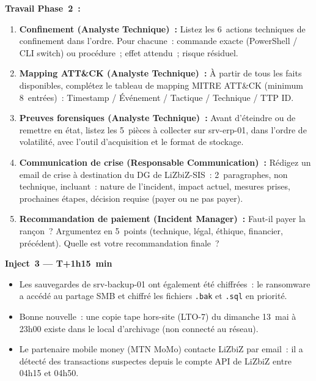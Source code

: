 \begin{boxexo}
\textbf{Travail Phase~2~:}

\begin{enumerate}
  \item \textbf{Confinement (Analyste Technique)~:}
    Listez les 6~actions techniques de confinement dans l'ordre.
    Pour chacune~: commande exacte (PowerShell / CLI switch) ou
    procédure~; effet attendu~; risque résiduel.

  \item \textbf{Mapping ATT\&CK (Analyste Technique)~:}
    À partir de tous les faits disponibles, complétez le tableau
    de mapping MITRE ATT\&CK (minimum 8~entrées)~:
    Timestamp / Événement / Tactique / Technique / TTP ID.

  \item \textbf{Preuves forensiques (Analyste Technique)~:}
    Avant d'éteindre ou de remettre en état, listez les 5~pièces
    à collecter sur srv-erp-01, dans l'ordre de volatilité,
    avec l'outil d'acquisition et le format de stockage.

  \item \textbf{Communication de crise (Responsable Communication)~:}
    Rédigez un email de crise à destination du DG de LiZbiZ-SIS~:
    2~paragraphes, non technique, incluant~: nature de l'incident,
    impact actuel, mesures prises, prochaines étapes,
    décision requise (payer ou ne pas payer).

  \item \textbf{Recommandation de paiement (Incident Manager)~:}
    Faut-il payer la rançon~? Argumentez en 5~points (technique,
    légal, éthique, financier, précédent). Quelle est votre
    recommandation finale~?
\end{enumerate}
\end{boxexo}

\begin{boxlizbiz}
\textbf{Inject~3 — T+1h15~min}

\begin{itemize}
  \item Les sauvegardes de srv-backup-01 ont également été chiffrées~:
    le ransomware a accédé au partage SMB et chiffré les fichiers
    \texttt{.bak} et \texttt{.sql} en priorité.
  \item Bonne nouvelle~: une copie tape hors-site (LTO-7) du dimanche
    13~mai à 23h00 existe dans le local d'archivage (non connecté
    au réseau).
  \item Le partenaire mobile money (MTN MoMo) contacte LiZbiZ par
    email~: il a détecté des transactions suspectes depuis le
    compte API de LiZbiZ entre 04h15 et 04h50.
\end{itemize}
\end{boxlizbiz}


